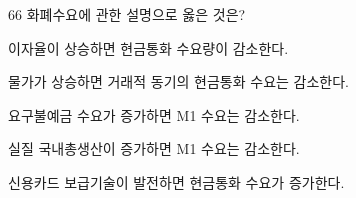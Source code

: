\begin{question}{66}
화폐수요에 관한 설명으로 옳은 것은?
\begin{choices}
  \item 이자율이 상승하면 현금통화 수요량이 감소한다.
  \item 물가가 상승하면 거래적 동기의 현금통화 수요는 감소한다.
  \item 요구불예금 수요가 증가하면 M1 수요는 감소한다.
  \item 실질 국내총생산이 증가하면 M1 수요는 감소한다.
  \item 신용카드 보급기술이 발전하면 현금통화 수요가 증가한다.
\end{choices}
\end{question}
